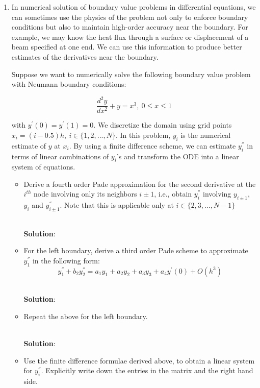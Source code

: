 \documentclass{article}
\newcommand{\soln}{\\ \textbf{Solution}: }
\begin{document}
\begin{enumerate}
\item In numerical solution of boundary value problems in differential equations, we can
sometimes use the physics of the problem not only to enforce boundary conditions but also
to maintain high-order accuracy near the boundary. For example, we may know the heat flux
through a surface or displacement of a beam specified at one end. We can use this
information to produce better estimates of the derivatives near the boundary.

Suppose we want to numerically solve the following boundary value problem with Neumann
boundary conditions:

\begin{equation*}
    \frac{d^{2} y}{dx^{2}} + y = x^{3}, \ 0 \leq x \leq 1
\end{equation*}

with $y^{'}(0) = y^{'}(1) = 0$. We discretize the domain using grid points $x_{i} = 
(i - 0.5)h, \ i \in \{1,2,...,N\}$. In this problem, $y_{i}$ is the numerical estimate of 
$y$ at $x_{i}$. By using a finite difference scheme, we can estimate $y_{i}^{''}$ in terms 
of linear combinations of $y_{i}$'s and transform the ODE into a linear system of equations.

\begin{itemize}

    \item Derive a fourth order Pade approximation for the second derivative at the
        $i^{th}$ node involving only its neighbors $i \pm 1$, i.e., obtain $y_{i}^{''}$
        involving $y_{i \pm 1}$, $y_{i}$ and $y_{i \pm 1}^{''}$. Note that this is
        applicable only at $i \in \{2,3,...,N-1\}$

        \soln

    \item For the left boundary, derive a third order Pade scheme to approximate
        $y_{1}^{''}$ in the following form:
        \begin{equation*}
            y_{1}^{''} + b_{2} y_{2}^{''} = a_{1}y_{1} + a_{2}y_{2} + a_{3}y_{3} +
            a_{4}y^{'}(0) + O(h^{3})
        \end{equation*}

        \soln

    \item Repeat the above for the left boundary.

        \soln

    \item Use the finite difference formulae derived above, to obtain a linear system for
        $y_{i}^{''}$. Explicitly write down the entries in the matrix and the right hand
        side.


\end{itemize}
\end{enumerate}
\end{document}
